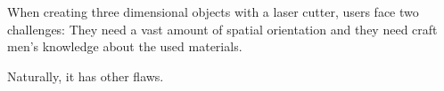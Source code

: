 \documentclass[../ClassicThesis.tex]{subfiles}
\begin{document}
When creating three dimensional objects with a laser cutter, users
face two challenges: They need a vast amount of spatial orientation
and they need craft men's knowledge about the used materials.


Naturally, it has other flaws.











\end{document}
